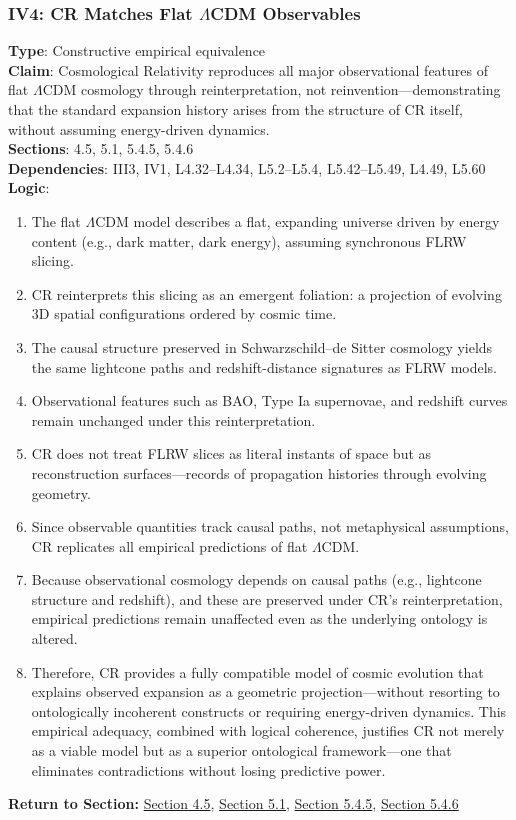 \documentclass[12pt]{book}
\begin{document}
\subsubsection*{IV4: CR Matches Flat $\Lambda$CDM Observables}
\label{appendix:IV4}
\textbf{Type}: Constructive empirical equivalence\\
\textbf{Claim}: Cosmological Relativity reproduces all major observational features of flat $\Lambda$CDM cosmology through reinterpretation, not reinvention---demonstrating that the standard expansion history arises from the structure of CR itself, without assuming energy-driven dynamics.\\
\textbf{Sections}: 4.5, 5.1, 5.4.5, 5.4.6\\
\textbf{Dependencies}: III3, IV1, L4.32–L4.34, L5.2–L5.4, L5.42–L5.49, L4.49, L5.60\\
\textbf{Logic}:
\begin{enumerate}
    \item The flat $\Lambda$CDM model describes a flat, expanding universe driven by energy content (e.g., dark matter, dark energy), assuming synchronous FLRW slicing.
    \item CR reinterprets this slicing as an emergent foliation: a projection of evolving 3D spatial configurations ordered by cosmic time.
    \item The causal structure preserved in Schwarzschild–de Sitter cosmology yields the same lightcone paths and redshift-distance signatures as FLRW models.
    \item Observational features such as BAO, Type Ia supernovae, and redshift curves remain unchanged under this reinterpretation.
    \item CR does not treat FLRW slices as literal instants of space but as reconstruction surfaces---records of propagation histories through evolving geometry.
    \item Since observable quantities track causal paths, not metaphysical assumptions, CR replicates all empirical predictions of flat $\Lambda$CDM.
    \item Because observational cosmology depends on causal paths (e.g., lightcone structure and redshift), and these are preserved under CR's reinterpretation, empirical predictions remain unaffected even as the underlying ontology is altered.
    \item Therefore, CR provides a fully compatible model of cosmic evolution that explains observed expansion as a geometric projection---without resorting to ontologically incoherent constructs or requiring energy-driven dynamics. This empirical adequacy, combined with logical coherence, justifies CR not merely as a viable model but as a superior ontological framework---one that eliminates contradictions without losing predictive power.
\end{enumerate}
\textbf{Return to Section:} \hyperref[sec:4.5]{Section 4.5}, \hyperref[sec:5.1]{Section 5.1}, \hyperref[sec:5.4.5]{Section 5.4.5}, \hyperref[sec:5.4.6]{Section 5.4.6}
\end{document}
